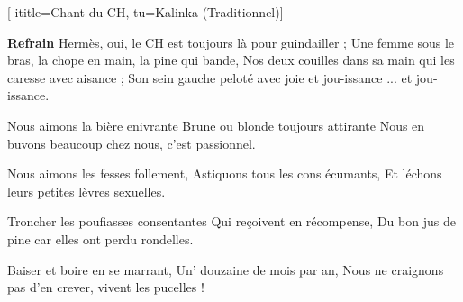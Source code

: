 [
ititle={Chant du CH},
tu={Kalinka (Traditionnel)}]

\beginchorus
\textbf {Refrain}
Hermès, oui, le CH est toujours là pour guindailler ;
Une femme sous le bras, la chope en main, la pine qui bande,
Nos deux couilles dans sa main qui les caresse avec aisance ;
Son sein gauche peloté avec joie et jou-issance ... et jou-issance.
\endchorus

\beginverse
Nous aimons la bière enivrante
Brune ou blonde toujours attirante
Nous en buvons beaucoup chez nous, c'est passionnel.
\endverse

\beginverse
Nous aimons les fesses follement,
Astiquons tous les cons écumants,
Et léchons leurs petites lèvres sexuelles.
\endverse

\beginverse
Troncher les poufiasses consentantes
Qui reçoivent en récompense,
Du bon jus de pine car elles ont perdu rondelles.
\endverse

\beginverse
Baiser et boire en se marrant,
Un' douzaine de mois par an,
Nous ne craignons pas d'en crever, vivent les pucelles !
\endverse

\endsong